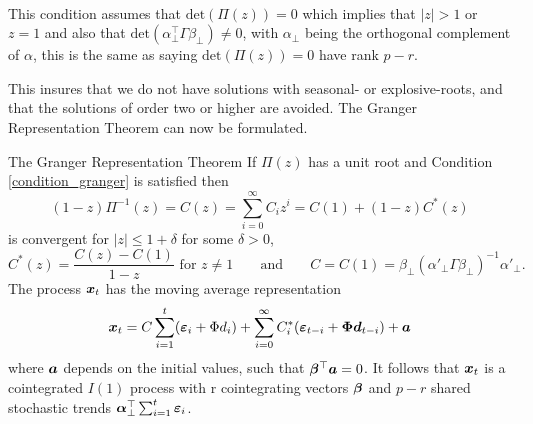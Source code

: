 \begin{condition}\phantom{}\\
    This condition assumes that $\text{det}(\Pi(z))=0$ which implies that $|z|>1$ or $z=1$ and also that $\text{det}(\alpha^\top_{\perp}\Gamma \beta_{\perp})\neq0$, with $\alpha_{\perp}$ being the orthogonal complement of $\alpha$, this is the same as saying $\text{det}(\Pi(z))=0$ have rank $p-r$.
    \label{condition_granger}
\end{condition}

\noindent This insures that we do not have solutions with seasonal- or explosive-roots, and that the solutions of order two or higher are avoided. The Granger Representation Theorem can now be formulated.
\begin{thm}{The Granger Representation Theorem}
    If $\Pi(z)$ has a unit root and Condition \ref{condition_granger} is satisfied then
    \begin{equation}\label{Granger_representation_eq_1}
        (1-z)\Pi^{-1}(z)=C(z)=\sum^{\infty}_{i=0}C_iz^i=C(1)+(1-z)C^\ast(z)
    \end{equation}
    is convergent for $|z|\leq1+\delta
    $ for some $\delta>0$,
    \begin{equation*}
C^{\ast}(z)=\frac{C(z)-C(1)}{1-z}\text{ for }z\neq 1\;\;\;\;\;\;\;\text{and}\;\;\;\;\;\;\;C=C(1)=\beta_\perp(\alpha'_{\perp}\Gamma\beta_{\perp})^{-1}\alpha'_{\perp}.
    \end{equation*}
The process $\boldsymbol{x}_t$ has the moving average representation
\begin{equation}\label{granger_representation_eq_3}
    \boldsymbol{x}_t=C\sum_{i=1}^{t}(\boldsymbol{\varepsilon}_{i}+\Phi d_i)+\sum_{i=0}^{\infty}C_{i}^\ast(\boldsymbol{\varepsilon}_{t-i}+\boldsymbol{\Phi} \boldsymbol{d}_{t-i})+\boldsymbol{a}
\end{equation}
where $\boldsymbol{a}$ depends on the initial values, such that $\boldsymbol{\beta}^\top\boldsymbol{a}=0$. It follows that $\boldsymbol{x}_t$ is a cointegrated $I(1)$ process with r cointegrating vectors $\boldsymbol{\beta}$ and $p-r$ shared stochastic trends $\boldsymbol{\alpha}^\top_{\perp}\sum_{i=1}^{t}\boldsymbol{\varepsilon}_i$.
\newline
\end{thm}
